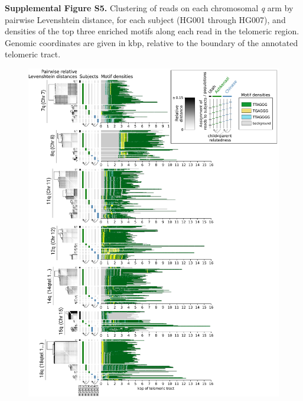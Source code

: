 \documentclass{article}
\begin{document}
\begin{samepage}

\noindent \textbf{Supplemental Figure S5.}
Clustering of reads on each chromosomal \textit{q} arm by pairwise Levenshtein distance, for each subject (HG001 through HG007), and densities of the top three enriched motifs along each read in the telomeric region.
Genomic coordinates are given in kbp, relative to the boundary of the annotated telomeric tract.

\begin{figure}[h!] \centering
\includegraphics[width=.99\textwidth,keepaspectratio]{Figure_S5-nolegend.pdf}
\end{figure}

\end{samepage}
\end{document}
